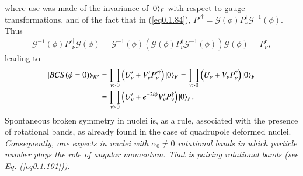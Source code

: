 where use was made of the invariance of $|{0} \rangle_F$ with respect to gauge transformations, and of the fact that in (\ref{eq0.1.84}), $P'^\dagger=\mathcal G(\phi)P^\dagger_\nu\mathcal G^{-1}(\phi)$. Thus 
\begin{align}\label{eq0.1.89}
\mathcal G^{-1}(\phi)P'^\dagger_\nu\mathcal G(\phi)=\mathcal G^{-1}(\phi)\left(\mathcal G(\phi)P^\dagger_\nu\mathcal G^{-1}(\phi)\right)\mathcal G(\phi)=P^\dagger_\nu,
\end{align}
leading to
\begin{align}\label{eq0.1.90}
\nonumber|{BCS(\phi=0)} \rangle_{\mathcal K'}&=\prod_{\nu>0}\left(U'_\nu+V'_\nu P'^\dagger_\nu\right)|{0} \rangle_F=\prod_{\nu>0}\left(U_\nu+V_\nu P^\dagger_\nu\right)|{0} \rangle_F\\
&=\prod_{\nu>0}\left(U'_\nu+e^{-2i\phi}V'_\nu P^\dagger_\nu\right)|{0} \rangle_F.
\end{align}
Spontaneous broken symmetry in nuclei is, as a rule, associated with the presence of rotational bands, as already found in the case of quadrupole deformed nuclei. \textit{Consequently, one expects in nuclei with $\alpha_0\neq0$ rotational bands in which particle number plays the role of angular momentum. That is pairing rotational bands (see Eq. (\ref{eq0.1.101})).}


